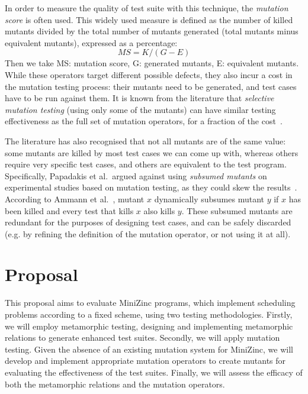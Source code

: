 In order to measure the quality of test suite with this technique, the \textit{mutation score} is often used. This widely used measure is defined as the number of killed mutants divided by the total number of mutants generated (total mutants minus equivalent mutants), expressed as a percentage:
\begin{displaymath}
  MS = K / (G-E)
\end{displaymath}
Then we take MS: mutation score, G: generated mutants, E: equivalent mutants.\\



While these operators target different possible defects, they also incur a cost in the mutation testing process: their mutants need to be generated, and test cases have to be run against them. It is known from the literature that \emph{selective mutation testing} (using only some of the mutants) can have similar testing effectiveness as the full set of mutation operators, for a fraction of the cost~\cite{Mresa99OpMut}.

The literature has also recognised that not all mutants are of the same value: some mutants are killed by most test cases we can come up with, whereas others require very specific test cases, and others are equivalent to the test program. Specifically, Papadakis et al.\ argued against using \emph{subsumed mutants} on experimental studies based on mutation testing, as they could skew the results~\cite{papadakis_threats_2016}. According to Ammann et al.~\cite{ammann_establishing_2014}, mutant $x$ dynamically subsumes mutant $y$ if $x$ has been killed and every test that kills $x$ also kills $y$. These subsumed mutants are redundant for the purposes of designing test cases, and can be safely discarded (e.g. by refining the definition of the mutation operator, or not using it at all).


\section{Proposal}
\label{sec:proposal}
This proposal aims to evaluate MiniZinc programs, which implement scheduling problems according to a fixed scheme, using two testing methodologies. Firstly, we will employ metamorphic testing, designing and implementing metamorphic relations to generate enhanced test suites. Secondly, we will apply mutation testing. Given the absence of an existing mutation system for MiniZinc, we will develop and implement appropriate mutation operators to create mutants for evaluating the effectiveness of the test suites. Finally, we will assess the efficacy of both the metamorphic relations and the mutation operators.

